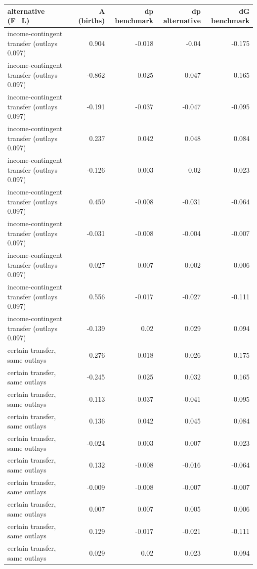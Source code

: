 \begin{tabular}{lrrrr}
\toprule
alternative (F\_L) & A (births) & dp benchmark & dp alternative & dG benchmark \\
\midrule
income-contingent transfer (outlays 0.097) & 0.904 & -0.018 & -0.04 & -0.175 \\
income-contingent transfer (outlays 0.097) & -0.862 & 0.025 & 0.047 & 0.165 \\
income-contingent transfer (outlays 0.097) & -0.191 & -0.037 & -0.047 & -0.095 \\
income-contingent transfer (outlays 0.097) & 0.237 & 0.042 & 0.048 & 0.084 \\
income-contingent transfer (outlays 0.097) & -0.126 & 0.003 & 0.02 & 0.023 \\
income-contingent transfer (outlays 0.097) & 0.459 & -0.008 & -0.031 & -0.064 \\
income-contingent transfer (outlays 0.097) & -0.031 & -0.008 & -0.004 & -0.007 \\
income-contingent transfer (outlays 0.097) & 0.027 & 0.007 & 0.002 & 0.006 \\
income-contingent transfer (outlays 0.097) & 0.556 & -0.017 & -0.027 & -0.111 \\
income-contingent transfer (outlays 0.097) & -0.139 & 0.02 & 0.029 & 0.094 \\
certain transfer, same outlays & 0.276 & -0.018 & -0.026 & -0.175 \\
certain transfer, same outlays & -0.245 & 0.025 & 0.032 & 0.165 \\
certain transfer, same outlays & -0.113 & -0.037 & -0.041 & -0.095 \\
certain transfer, same outlays & 0.136 & 0.042 & 0.045 & 0.084 \\
certain transfer, same outlays & -0.024 & 0.003 & 0.007 & 0.023 \\
certain transfer, same outlays & 0.132 & -0.008 & -0.016 & -0.064 \\
certain transfer, same outlays & -0.009 & -0.008 & -0.007 & -0.007 \\
certain transfer, same outlays & 0.007 & 0.007 & 0.005 & 0.006 \\
certain transfer, same outlays & 0.129 & -0.017 & -0.021 & -0.111 \\
certain transfer, same outlays & 0.029 & 0.02 & 0.023 & 0.094 \\
\bottomrule
\end{tabular}
